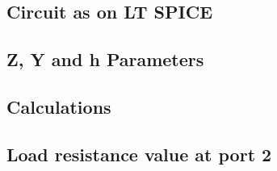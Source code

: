 \documentclass{article}[12pt]
\begin{document}
\subsection*{Circuit as on LT SPICE}
\subsection*{Z, Y and h Parameters}
\subsection*{Calculations}
\subsection*{Load resistance value at port 2}
\end{document}
